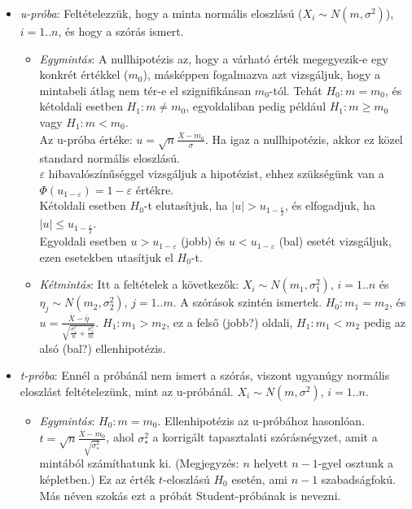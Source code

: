 \documentclass[tikz,12pt,margin=0px]{article}
\newcommand\ddfrac[2]{\frac{\displaystyle #1}{\displaystyle #2}}
\begin{document}
	\begin{itemize}
		\item \textit{u-próba}: Feltételezzük, hogy a minta normális eloszlású ($X_i \sim N(m, \sigma^2)$), $i=1..n$, és hogy a szórás ismert.
			\begin{itemize}
        \item \textit{Egymintás}: A nullhipotézis az, hogy a várható érték megegyezik-e egy konkrét értékkel ($m_0$), másképpen fogalmazva azt vizsgáljuk, hogy a mintabeli átlag nem tér-e el szignifikánsan $m_0$-tól. Tehát $H_0: m = m_0$, és kétoldali esetben $H_1: m \neq m_0$, egyoldaliban pedig például $H_1: m \geq m_0$ vagy $H_1: m < m_0$. \\
				Az u-próba értéke: $u = \sqrt{n}\ddfrac{\overline{X} - m_0}{\sigma}$. Ha igaz a nullhipotézis, akkor ez közel standard normális eloszlású. \\
				$\varepsilon$ hibavalószínűséggel vizsgáljuk a hipotézist, ehhez szükségünk van a $\Phi(u_{1-\varepsilon}) = 1 - \varepsilon$ értékre. \\
				Kétoldali esetben $H_0$-t elutasítjuk, ha $|u| > u_{1-\ddfrac{\varepsilon}{2}}$, és elfogadjuk, ha $|u| \leq u_{1-\ddfrac{\varepsilon}{2}}$. \\
				Egyoldali esetben $u > u_{1-\varepsilon}$ (jobb) és $u < u_{1-\varepsilon}$ (bal) esetét vizsgáljuk, ezen esetekben utasítjuk el $H_0$-t.
		\item \textit{Kétmintás}: Itt a feltételek a következők: $X_i \sim N(m_1, \sigma_1^2)$, $i=1..n$ és $\eta_j \sim N(m_2, \sigma_2^2)$, $j=1..m$. A szórások szintén ismertek. $H_0: m_1 = m_2$, és $u = \ddfrac{\overline{X} - \overline{\eta}}{\sqrt{\ddfrac{\sigma_1^2}{n} + \ddfrac{\sigma_2^2}{m}}}$. $H_1 : m_1 > m_2$, ez a felső (jobb?) oldali, $H_1 : m_1 < m_2$ pedig az alsó (bal?) ellenhipotézis.
			\end{itemize}
		\item \textit{t-próba}:	Ennél a próbánál nem ismert a szórás, viszont ugyanúgy normális eloszlást feltételezünk, mint az u-próbánál. $X_i \sim N(m, \sigma^2)$, $i=1..n$.
			\begin{itemize}
				\item \textit{Egymintás}: $H_0: m = m_0$. Ellenhipotézis az u-próbához hasonlóan. $t = \sqrt{n}\ddfrac{\overline{X} - m_0}{\sqrt{\sigma_{*}^2}}$, ahol $\sigma_{*}^2$ a korrigált tapasztalati szórásnégyzet, amit a mintából számíthatunk ki. (Megjegyzés: $n$ helyett $n-1$-gyel osztunk a képletben.) Ez az érték $t$-eloszlású $H_0$ esetén, ami $n-1$ szabadságfokú. Más néven szokás ezt a próbát Student-próbának is nevezni.

\end{itemize}
\end{itemize}
\end{document}
